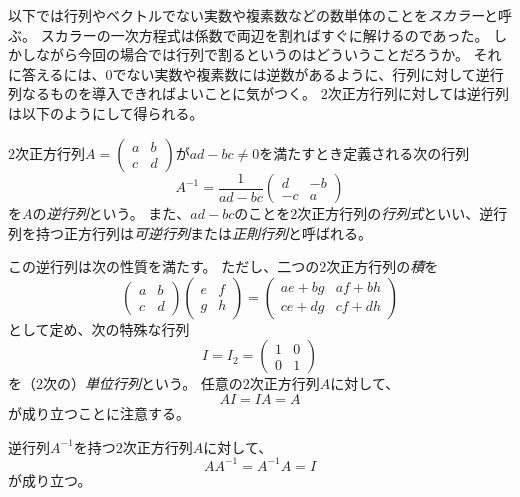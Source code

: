 以下では行列やベクトルでない実数や複素数などの数単体のことを\emph{スカラー}と呼ぶ。
スカラーの一次方程式は係数で両辺を割ればすぐに解けるのであった。
しかしながら今回の場合では行列で割るというのはどういうことだろうか。
それに答えるには、$0$でない実数や複素数には逆数があるように、行列に対して逆行列なるものを導入できればよいことに気がつく。
$2$次正方行列に対しては逆行列は以下のようにして得られる。

\begin{definition}[$2$次の逆行列]
$2$次正方行列$A = \begin{pmatrix}a & b \\ c & d\end{pmatrix}$が$a d-b c \ne 0$を満たすとき定義される次の行列
$$
A^{-1} = \frac{1}{a d-b c}\begin{pmatrix}d & -b \\ -c & a\end{pmatrix}
$$
を$A$の\emph{逆行列}という。
また、$a d-b c$のことを$2$次正方行列の\emph{行列式}といい、逆行列を持つ正方行列は\emph{可逆行列}または\emph{正則行列}と呼ばれる。
\end{definition}

この逆行列は次の性質を満たす。
ただし、二つの$2$次正方行列の\emph{積}を
$$
\begin{pmatrix}a & b \\ c & d\end{pmatrix}\begin{pmatrix}e & f \\ g & h\end{pmatrix}
= \begin{pmatrix}a e+b g & a f+b h \\ c e+d g & c f+d h\end{pmatrix}
$$
として定め、次の特殊な行列
$$
I = I_2 = \begin{pmatrix}1 & 0 \\ 0 & 1\end{pmatrix}
$$
を（$2$次の）\emph{単位行列}という。
任意の$2$次正方行列$A$に対して、
$$
A I = I A = A
$$
が成り立つことに注意する。

\begin{proposition}[逆行列]
逆行列$A^{-1}$を持つ$2$次正方行列$A$に対して、
$$
A A^{-1} = A^{-1} A = I
$$
が成り立つ。
\end{proposition}

